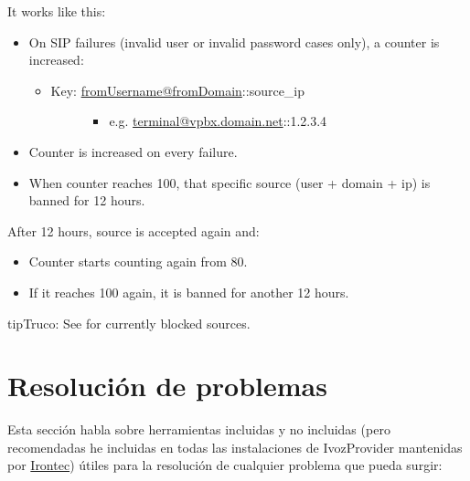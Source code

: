 \documentclass[letterpaper,10pt,spanish]{sphinxmanual}
\begin{document}
It works like this:
\begin{itemize}
\item {} 
On SIP failures (invalid user or invalid password cases only), a counter is increased:
\begin{itemize}
\item {} \begin{description}
\item[{Key: \href{mailto:fromUsername@fromDomain}{fromUsername@fromDomain}::source\_ip}] \leavevmode\begin{itemize}
\item {} 
e.g. \href{mailto:terminal@vpbx.domain.net}{terminal@vpbx.domain.net}::1.2.3.4

\end{itemize}

\end{description}

\end{itemize}

\item {} 
Counter is increased on every failure.

\item {} 
When counter reaches 100, that specific source (user + domain + ip) is banned for 12 hours.

\end{itemize}

After 12 hours, source is accepted again and:
\begin{itemize}
\item {} 
Counter starts counting again from 80.

\item {} 
If it reaches 100 again, it is banned for another 12 hours.

\end{itemize}

\begin{notice}{tip}{Truco:}
See {\hyperref[administration_portal/brand/views/bruteforce_attacks:brute\string-force\string-attacks]{}} for currently blocked sources.
\end{notice}


\chapter{Resolución de problemas}
\label{security_and_maintenance/maintenance/index::doc}\label{security_and_maintenance/maintenance/index:troubleshooting}
Esta sección habla sobre herramientas incluidas y no incluidas (pero recomendadas he incluidas en todas las instalaciones de IvozProvider mantenidas por \href{https://www.irontec.com}{Irontec}) útiles para la resolución de cualquier problema que pueda surgir:
\end{document}
